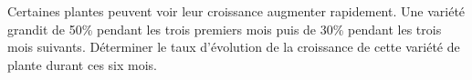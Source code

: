 
Certaines plantes peuvent voir leur croissance augmenter rapidement. Une variété grandit de 50\% pendant les trois premiers mois puis de 30\% pendant les trois mois suivants. Déterminer le taux d'évolution de la croissance de cette variété de plante durant ces six mois. 